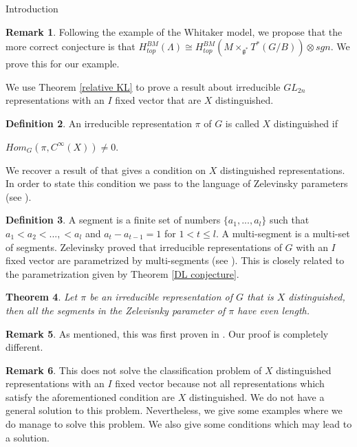 \documentclass[12pt]{article}
\newcommand{\<}{\langle}
\renewcommand{\>}{\rangle}
\theoremstyle{plain}
\newtheorem{theorem}{Theorem}[section]
\theoremstyle{definition}
\newtheorem{Remark}[theorem]{Remark}
\newtheorem{defn}[theorem]{Definition}
\begin{document}
\begin{section}{Introduction}
\begin{Remark}
    Following the example of the Whitaker model, we propose that the more correct conjecture is that $H^{BM}_{top}(\Lambda)\cong H^{BM}_{top}(M\times_{\mathfrak{g}^{*}} T^*(G/B))\otimes sgn$. We prove this for our example.

    \end{Remark}

We use Theorem \ref{relative KL} to prove a result about irreducible $GL_{2n}$ representations with an $I$ fixed vector that are $X$ distinguished.


\begin{defn}\label{dist rep}
    An irreducible representation $\pi$ of $G$ is called $X$ distinguished if 
    
    $Hom_G(\pi,C^\infty(X))\neq 0$. 
\end{defn}


 We recover a result of \cite{MitraOffenSayag2017} that gives a condition on $X$ distinguished representations. In order to state this condition we pass to the language of Zelevinsky parameters (see \cite{Zelevinsky1980}).

\begin{defn}\label{multisegments}
 A segment is a finite set of numbers $\{a_1,...,a_l\}$ such that $a_1<a_2<...,<a_l$ and $a_t-a_{t-1}=1$ for $1<t\leq l$. A multi-segment is a multi-set of segments. Zelevinsky proved that irreducible representations of $G$ with an $I$ fixed vector are parametrized by multi-segments (see \cite{Zelevinsky1980}). This is closely related to the parametrization given by Theorem \ref{DL conjecture}.  
    
\end{defn}

\begin{theorem}\label{even condition}
    Let $\pi$ be an irreducible representation of $G$ that is $X$ distinguished, then all the segments in the Zelevisnky parameter of $\pi$ have even length.
\end{theorem}

\begin{Remark}
    As mentioned, this was first proven in \cite{MitraOffenSayag2017}. Our proof is completely different.
\end{Remark}

\begin{Remark}
 This does not solve the classification problem of $X$ distinguished representations with an $I$ fixed vector because not all representations which satisfy the aforementioned condition are $X$ distinguished. We do not have a general solution to this problem. Nevertheless, we give some examples where we do manage to solve this problem. We also give some conditions which may lead to a solution.
   

\end{Remark}
\end{section}
\end{document}
